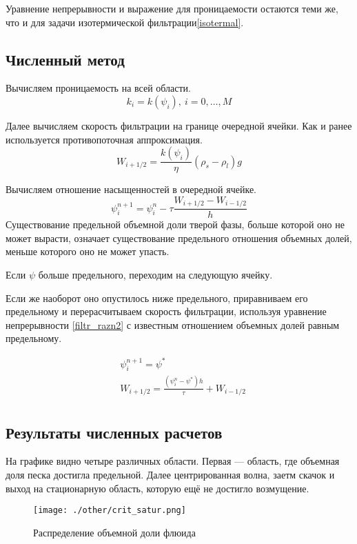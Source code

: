 \documentclass[12pt,a4paper]{article}
\begin{document}
Уравнение непрерывности и выражение для проницаемости остаются теми же, что и для задачи изотермической фильтрации\eqref{isotermal}.

\subsection{Численный метод}
Вычисляем проницаемость на всей области.
\begin{equation}
k_i = k(\psi_i) , \ i = 0,  \dots ,M
\label{perm_razn2}
\end{equation}

Далее вычисляем скорость фильтрации на границе очередной ячейки. Как и ранее используется противопоточная аппроксимация.
\begin{equation}
W_{i+1/2} = \frac{k(\psi_i)}{\eta}(\rho_s-\rho_l)g
\label{Darsi_razn2}
\end{equation}

Вычисляем отношение насыщенностей в очередной ячейке. 
\begin{equation}
\psi_i^{n+1} = \psi_i^n - \tau\frac{W_{i+1/2} - W_{i-1/2}}{h}
\label{filtr_razn2}
\end{equation}
Существование предельной объемной доли тверой фазы, больше которой оно не может вырасти, означает существование предельного отношения объемных долей, меньше которого оно не может упасть.

Если $\psi$ больше предельного, переходим на следующую ячейку.

Если же наоборот оно опустилось ниже предельного, приравниваем его предельному и перерасчитываем скорость фильтрации, используя уравнение непрерывности \eqref{filtr_razn2} с известным отношением объемных долей равным предельному.

\begin{equation}
\begin{aligned} 
&\psi_{i}^{n+1} = \psi^* \\
&W_{i+1/2} = \frac{(\psi_i^n - \psi^*)h}{\tau} + W_{i-1/2} \\
\end{aligned}
\label{corr_razn}
\end{equation}

\subsection{Результаты численных расчетов}
На графике видно четыре различных области. Первая --- область, где объемная доля песка достигла предельной. Далее центрированная волна, заетм скачок и выход на стационарную область, которую ещё не достигло возмущение. 
\begin{figure}[h!]
\begin{center}
\texttt{[image: ./other/crit\_satur.png]}
\caption{Распределение объемной доли флюида}
\end{center}
\end{figure}
\newpage
\end{document}
